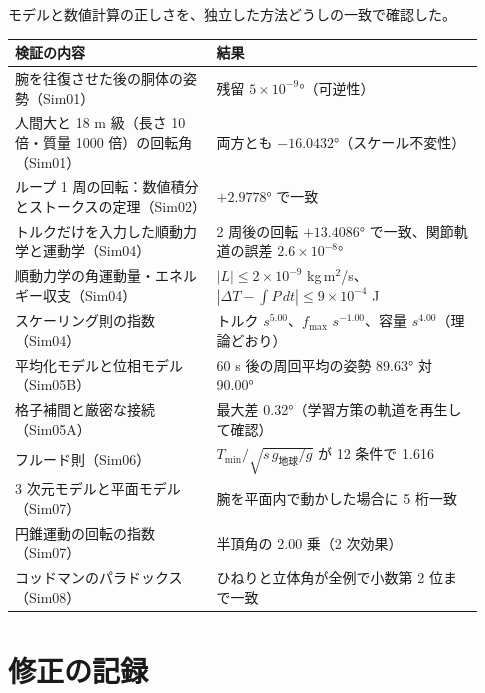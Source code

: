 モデルと数値計算の正しさを、独立した方法どうしの一致で確認した。

\begin{longtable}{p{0.40\linewidth}p{0.53\linewidth}}
\toprule
検証の内容 & 結果 \\ \midrule \endhead
腕を往復させた後の胴体の姿勢（Sim01） & 残留 $5\times10^{-9}$°（可逆性） \\
人間大と 18 m 級（長さ 10 倍・質量 1000 倍）の回転角（Sim01） & 両方とも $-16.0432$°（スケール不変性） \\
ループ 1 周の回転：数値積分とストークスの定理（Sim02） & $+2.9778$° で一致 \\
トルクだけを入力した順動力学と運動学（Sim04） & 2 周後の回転 $+13.4086$° で一致、関節軌道の誤差 $2.6\times10^{-8}$° \\
順動力学の角運動量・エネルギー収支（Sim04） & $|L|\le 2\times10^{-9}$ kg\,m$^2$/s、$|\Delta T - \int P\,dt| \le 9\times10^{-4}$ J \\
スケーリング則の指数（Sim04） & トルク $s^{5.00}$、$f_{\max}$ $s^{-1.00}$、容量 $s^{4.00}$（理論どおり） \\
平均化モデルと位相モデル（Sim05B） & 60 s 後の周回平均の姿勢 89.63° 対 90.00° \\
格子補間と厳密な接続（Sim05A） & 最大差 0.32°（学習方策の軌道を再生して確認） \\
フルード則（Sim06） & $T_{\min}/\sqrt{s\,g_{\text{地球}}/g}$ が 12 条件で 1.616 \\
3 次元モデルと平面モデル（Sim07） & 腕を平面内で動かした場合に 5 桁一致 \\
円錐運動の回転の指数（Sim07） & 半頂角の 2.00 乗（2 次効果） \\
コッドマンのパラドックス（Sim08） & ひねりと立体角が全例で小数第 2 位まで一致 \\
\bottomrule
\end{longtable}

\section{修正の記録}

